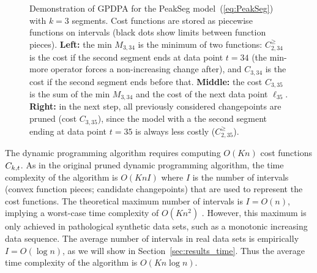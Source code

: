 \documentclass{article}
\begin{document}
\begin{figure}[t!]
  \centering
  
\vskip -0.5cm
  \caption{
    Demonstration of GPDPA for the PeakSeg model~(\ref{eq:PeakSeg})
    with $k=3$ segments. Cost functions are stored as piecewise
    functions on intervals (black dots show limits between function
    pieces). \textbf{Left:} the min $M_{3,34}$ is the minimum of two
    functions: $C^{\geq}_{2,34}$ is the cost if the second segment
    ends at data point $t=34$ (the min-more operator forces a
    non-increasing change after), and $C_{3,34}$ is the cost if the
    second segment ends before that. \textbf{Middle:} the cost
    $C_{3,35}$ is the sum of the min $M_{3,34}$ and the cost of the
    next data point $\ell_{35}$. \textbf{Right:} in the next step, all
    previously considered changepoints are pruned (cost $C_{3,35}$),
    since the model with a the second segment ending at data point
    $t=35$ is always less costly ($C^{\geq}_{2,35}$).  }
  \label{fig:min-envelope}
\end{figure}
The dynamic programming algorithm requires computing $O(Kn)$ cost
functions $C_{k,t}$. As in the original pruned dynamic programming
algorithm, the time complexity of the algorithm is $O(K n I)$ where
$I$ is the number of intervals (convex function pieces; candidate
changepoints) that are used to represent the cost functions. The
theoretical maximum number of intervals is $I=O(n)$, implying a
worst-case time complexity of $O(K n^2)$
\citep{pruned-dp-new}. However, this maximum is only achieved in
pathological synthetic data sets, such as a monotonic increasing data
sequence. The average number of intervals in real data sets is
empirically $I=O(\log n)$, as we will show in
Section~\ref{sec:results_time}. Thus the average time complexity of
the algorithm is $O(K n \log n)$.
\end{document}
